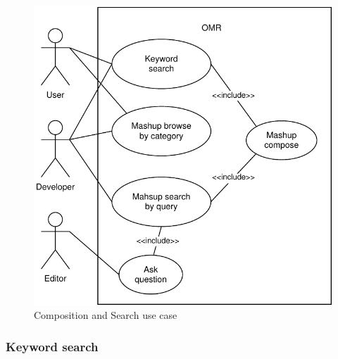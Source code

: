 \begin{figure}[h]
\centering
\includegraphics{graphics/uc1.pdf}
\caption{Composition and Search use case}
\label{fig:pack-uc1}
\end{figure}

\newpage
\subsubsection{Keyword search}
\label{subsec:keywordsearch}

